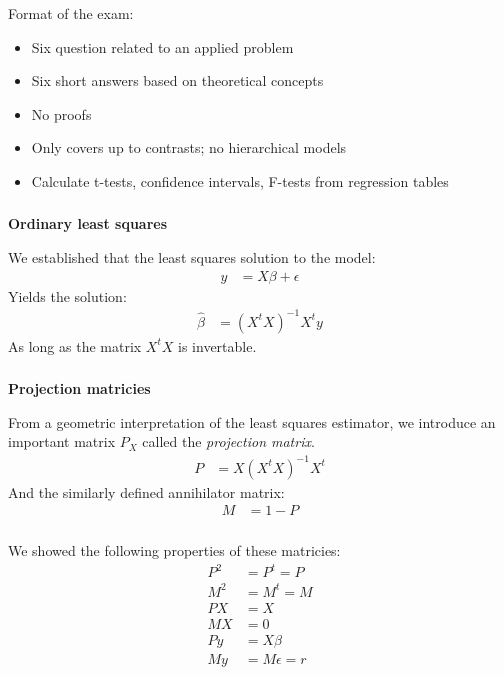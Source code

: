 \begin{frame}[fragile] \frametitle{}

Format of the exam:
\begin{itemize}
\item Six question related to an applied problem
\item Six short answers based on theoretical concepts
\item No proofs
\item Only covers up to contrasts; no hierarchical models
\item Calculate t-tests, confidence intervals, F-tests from
  regression tables
\end{itemize}

\end{frame}

\begin{frame}[fragile] \frametitle{}

{\bf Ordinary least squares}

We established that the least squares solution to the
model:
\begin{align*}
y &= X\beta + \epsilon
\end{align*}
Yields the solution:
\begin{align*}
\widehat{\beta} &= (X^t X)^{-1} X^t y
\end{align*}
As long as the matrix $X^t X$ is invertable.

\end{frame}

\begin{frame}[fragile] \frametitle{}

{\bf Projection matricies}

From a geometric interpretation of the least squares estimator,
we introduce an important matrix $P_X$ called the {\it projection matrix}.
\begin{align*}
P &= X (X^t X)^{-1} X^t
\end{align*}
And the similarly defined annihilator matrix:
\begin{align*}
M &= 1 - P
\end{align*}

\end{frame}

\begin{frame}[fragile] \frametitle{}

We showed the following properties of these matricies:
\begin{align*}
P^2 &= P^t = P \\
M^2 &= M^t = M \\
PX &= X \\
MX &= 0 \\
Py &= X\beta \\
My &= M\epsilon = r
\end{align*}

\end{frame}


